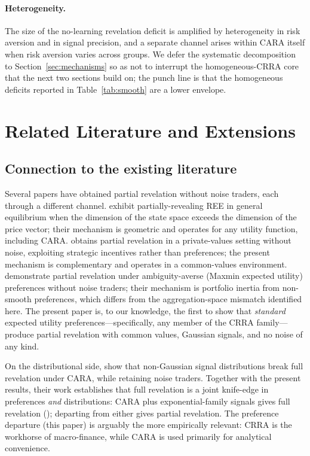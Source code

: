 \documentclass[12pt,letterpaper]{article}
\theoremstyle{definition}
\theoremstyle{remark}
\newcommand{\1}{\mathbf{1}}
\begin{document}
\paragraph{Heterogeneity.} The size of the no-learning revelation deficit
is amplified by heterogeneity in risk aversion and in signal precision,
and a separate channel arises within CARA itself when risk aversion
varies across groups. We defer the systematic decomposition to
Section~\ref{sec:mechanisms} so as not to interrupt the homogeneous-CRRA
core that the next two sections build on; the punch line is that the
homogeneous deficits reported in Table~\ref{tab:smooth} are a lower
envelope.


\section{Related Literature and Extensions}\label{sec:literature}

\subsection{Connection to the existing literature}

Several papers have obtained partial revelation without noise traders,
each through a different channel. \citet{HeifetzPolemarchakis1998} exhibit
partially-revealing REE in general equilibrium when the dimension of
the state space exceeds the dimension of the price vector; their mechanism
is geometric and operates for any utility function, including CARA.
\citet{Vives2011} obtains partial revelation in a private-values setting
without noise, exploiting strategic incentives rather than preferences;
the present mechanism is complementary and operates in a common-values
environment. \citet{CondieGanguli2011} demonstrate partial revelation
under ambiguity-averse (Maxmin expected utility) preferences without
noise traders; their mechanism is portfolio inertia from non-smooth
preferences, which differs from the aggregation-space mismatch identified
here. The present paper is, to our knowledge, the first to show that
\emph{standard} expected utility preferences---specifically, any member
of the CRRA family---produce partial revelation with common values,
Gaussian signals, and no noise of any kind.

On the distributional side, \citet{AlbagliHellwigTsyvinski2024} show
that non-Gaussian signal distributions break full revelation under CARA,
while retaining noise traders. Together with the present results, their
work establishes that full revelation is a joint knife-edge in preferences
\emph{and} distributions: CARA plus exponential-family signals gives full
revelation (\citealt{BreonDrish2015}); departing from either gives partial
revelation. The preference departure (this paper) is arguably the more
empirically relevant: CRRA is the workhorse of macro-finance, while CARA
is used primarily for analytical convenience.
\end{document}
